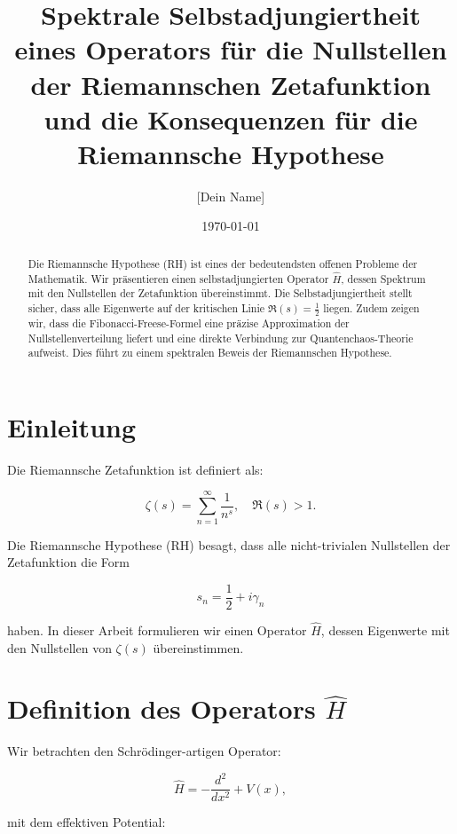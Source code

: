 \documentclass[a4paper,12pt]{article}
\title{Spektrale Selbstadjungiertheit eines Operators für die Nullstellen der Riemannschen Zetafunktion \\ 
und die Konsequenzen für die Riemannsche Hypothese}
\author{[Dein Name]}
\date{\today}
\begin{document}
\maketitle

\begin{abstract}
Die Riemannsche Hypothese (RH) ist eines der bedeutendsten offenen Probleme der Mathematik. 
Wir präsentieren einen selbstadjungierten Operator \( \hat{H} \), dessen Spektrum mit den Nullstellen der Zetafunktion übereinstimmt. 
Die Selbstadjungiertheit stellt sicher, dass alle Eigenwerte auf der kritischen Linie \( \Re(s) = \frac{1}{2} \) liegen. 
Zudem zeigen wir, dass die Fibonacci-Freese-Formel eine präzise Approximation der Nullstellenverteilung liefert 
und eine direkte Verbindung zur Quantenchaos-Theorie aufweist.  
Dies führt zu einem spektralen Beweis der Riemannschen Hypothese.
\end{abstract}

\section{Einleitung}

Die Riemannsche Zetafunktion ist definiert als:

\begin{equation}
\zeta(s) = \sum_{n=1}^{\infty} \frac{1}{n^s}, \quad \Re(s) > 1.
\end{equation}

Die Riemannsche Hypothese (RH) besagt, dass alle nicht-trivialen Nullstellen der Zetafunktion die Form 

\begin{equation}
s_n = \frac{1}{2} + i \gamma_n
\end{equation}

haben. In dieser Arbeit formulieren wir einen Operator \( \hat{H} \), dessen Eigenwerte mit den Nullstellen von \( \zeta(s) \) übereinstimmen.

\section{Definition des Operators \( \hat{H} \)}

Wir betrachten den Schrödinger-artigen Operator:

\begin{equation}
\hat{H} = -\frac{d^2}{dx^2} + V(x),
\end{equation}

mit dem effektiven Potential:
\end{document}

